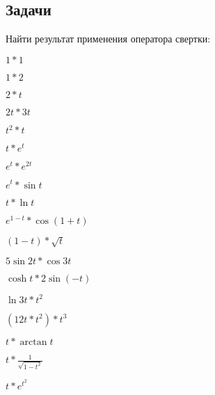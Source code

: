 \subsection{Задачи}

	Найти результат применения оператора свертки:

	\begin{multicols}{4}
		\begin{enumtasks}

			\item \( 1 * 1 \)
			\item \( 1 * 2 \)
			\item \( 2 * t \)
			\item \( 2t * 3t \)
			\item \( t^2 * t \)
			\item \( t * e^t \)
			\item \( e^t * e^{2t} \)
			\item \( e^t * \sin{t} \)
			\item \( t * \ln{t} \)
			\item \( e^{1-t} * \cos(1+t) \)
			\item \( (1-t) * \sqrt{t} \)
			\item \( 5 \sin{2t} * \cos{3t} \)
			\item \( \cosh{t} * 2 \sin(-t) \)
			\item \( \ln{3t} * t^2 \)
			\item \( \left( 12 t * t^2 \right) * t^3 \)
			\item \( t * \arctan{t} \)

		\end{enumtasks}
	\end{multicols}
	\begin{multicols}{2}
		\begin{enumtasks}
		
			\item \( t * \frac{1}{\sqrt{1 - t^2}} \)
			\item \( t * e^{t^2} \)

		\end{enumtasks}
	\end{multicols}

	\vspace{15pt}

